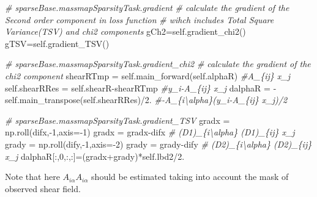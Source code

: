 \documentclass[11pt]{article}
\newenvironment{Shaded}{}{}
\newcommand{\DecValTok}[1]{\textcolor[rgb]{0.25,0.63,0.44}{{#1}}}
\newcommand{\FloatTok}[1]{\textcolor[rgb]{0.25,0.63,0.44}{{#1}}}
\newcommand{\CommentTok}[1]{\textcolor[rgb]{0.38,0.63,0.69}{\textit{{#1}}}}
\newcommand{\NormalTok}[1]{{#1}}
\newcommand{\VariableTok}[1]{\textcolor[rgb]{0.10,0.09,0.49}{{#1}}}
\newcommand{\OperatorTok}[1]{\textcolor[rgb]{0.40,0.40,0.40}{{#1}}}
\begin{document}
    \begin{Shaded}
\begin{Highlighting}[]

\CommentTok{# sparseBase.massmapSparsityTask.gradient}
\CommentTok{# calculate the gradient of the Second order component in loss function }
\CommentTok{# wihch includes Total Square Variance(TSV) and chi2 components}
\NormalTok{gCh2}\OperatorTok{=}\VariableTok{self}\NormalTok{.gradient_chi2()}
\NormalTok{gTSV}\OperatorTok{=}\VariableTok{self}\NormalTok{.gradient_TSV()}

\CommentTok{# sparseBase.massmapSparsityTask.gradient_chi2}
\CommentTok{# calculate the gradient of the chi2 component}
\NormalTok{shearRTmp   }\OperatorTok{=}   \VariableTok{self}\NormalTok{.main_forward(}\VariableTok{self}\NormalTok{.alphaR) }\CommentTok{#A_\{ij\} x_j}
\VariableTok{self}\NormalTok{.shearRRes   }\OperatorTok{=}   \VariableTok{self}\NormalTok{.shearR}\OperatorTok{-}\NormalTok{shearRTmp     }\CommentTok{#y_i-A_\{ij\} x_j}
\NormalTok{dalphaR     }\OperatorTok{=}   \OperatorTok{-}\VariableTok{self}\NormalTok{.main_transpose(}\VariableTok{self}\NormalTok{.shearRRes)}\OperatorTok{/}\FloatTok{2.} \CommentTok{#-A_\{i\textbackslash{}alpha\}(y_i-A_\{ij\} x_j)/2}

\CommentTok{# sparseBase.massmapSparsityTask.gradient_TSV}
\NormalTok{gradx   }\OperatorTok{=}\NormalTok{   np.roll(difx,}\OperatorTok{-}\DecValTok{1}\NormalTok{,axis}\OperatorTok{=-}\DecValTok{1}\NormalTok{)}
\NormalTok{gradx   }\OperatorTok{=}\NormalTok{   gradx}\OperatorTok{-}\NormalTok{difx    }\CommentTok{# (D1)_\{i\textbackslash{}alpha\} (D1)_\{ij\} x_j}
\NormalTok{grady   }\OperatorTok{=}\NormalTok{   np.roll(dify,}\OperatorTok{-}\DecValTok{1}\NormalTok{,axis}\OperatorTok{=-}\DecValTok{2}\NormalTok{)  }
\NormalTok{grady   }\OperatorTok{=}\NormalTok{   grady}\OperatorTok{-}\NormalTok{dify    }\CommentTok{# (D2)_\{i\textbackslash{}alpha\} (D2)_\{ij\} x_j}
\NormalTok{dalphaR[:,}\DecValTok{0}\NormalTok{,:,:]}\OperatorTok{=}\NormalTok{(gradx}\OperatorTok{+}\NormalTok{grady)}\OperatorTok{*}\VariableTok{self}\NormalTok{.lbd2}\OperatorTok{/}\FloatTok{2.}
\end{Highlighting}
\end{Shaded}

    Note that here \(A_{i\alpha} A_{i\alpha}\) should be estimated taking
into account the mask of observed shear field.
\end{document}
